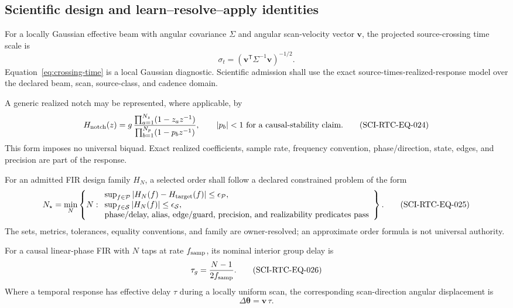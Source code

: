 \subsection{Scientific design and learn--resolve--apply identities}

For a locally Gaussian effective beam with angular covariance $\Sigma$ and
angular scan-velocity vector $\mathbf v$, the projected source-crossing time
scale is
\begin{equation}
 \sigma_t=\left(\mathbf v^{\mathsf T}\Sigma^{-1}\mathbf v\right)^{-1/2}.
 \tag{SCI-RTC-EQ-023}\label{eq:crossing-time}
\end{equation}
Equation~\eqref{eq:crossing-time} is a local Gaussian diagnostic.  Scientific
admission shall use the exact source-times-realized-response model over the
declared beam, scan, source-class, and cadence domain.

A generic realized notch may be represented, where applicable, by
\begin{equation}
 H_{\rm notch}(z)=g\,
 \frac{\prod_{a=1}^{N_z}(1-z_a z^{-1})}
      {\prod_{b=1}^{N_p}(1-p_b z^{-1})},
 \qquad |p_b|<1\ \text{for a causal-stability claim}.
 \tag{SCI-RTC-EQ-024}\label{eq:notch-response}
\end{equation}
This form imposes no universal biquad.  Exact realized coefficients, sample
rate, frequency convention, phase/direction, state, edges, and precision are
part of the response.

For an admitted FIR design family $H_N$, a selected order shall follow a
declared constrained problem of the form
\begin{equation}
 N_\star=\min_N\left\{N:\begin{array}{l}
 \sup_{f\in\mathcal P}|H_N(f)-H_{\rm target}(f)|\le\epsilon_{\mathcal P},\\
 \sup_{f\in\mathcal S}|H_N(f)|\le\epsilon_{\mathcal S},\\
 \text{phase/delay, alias, edge/guard, precision, and realizability predicates pass}
 \end{array}\right\}.
 \tag{SCI-RTC-EQ-025}\label{eq:fir-order-selection}
\end{equation}
The sets, metrics, tolerances, equality conventions, and family are
owner-resolved; an approximate order formula is not universal authority.

For a causal linear-phase FIR with $N$ taps at rate $f_{\rm samp}$, its
nominal interior group delay is
\begin{equation}
 \tau_g=\frac{N-1}{2f_{\rm samp}}.
 \tag{SCI-RTC-EQ-026}\label{eq:fir-group-delay}
\end{equation}
Where a temporal response has effective delay $\tau$ during a locally uniform
scan, the corresponding scan-direction angular displacement is
\begin{equation}
 \Delta\boldsymbol\theta=\mathbf v\,\tau .
 \tag{SCI-RTC-EQ-027}\label{eq:scan-displacement}
\end{equation}

